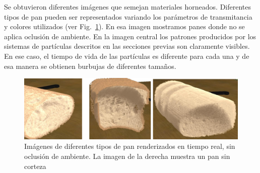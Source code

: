 Se obtuvieron diferentes imágenes que semejan materiales horneados.
Diferentes tipos de pan pueden ser representados variando los parámetros de transmitancia y colores utilizados (ver Fig.~\ref{fg:fig5}).
En esa imagen mostramos panes donde no se aplica oclusión de ambiente.
En la imagen central los patrones producidos por los sistemas de partículas descritos en las secciones previas son claramente visibles.
En ese caso, el tiempo de vida de las partículas es diferente para cada una y de esa manera se obtienen burbujas de diferentes tamaños.

\begin{figure}[htb!]
  \centerline{\includegraphics[width=13cm]{fig5}}
  \caption[Imágenes de diferentes tipos de pan renderizados en tiempo real, sin oclusión de ambiente]{Imágenes de diferentes tipos de pan renderizados en tiempo real, sin oclusión de ambiente. La imagen de la derecha muestra un pan sin corteza}
  \label{fg:fig5}
\end{figure}





